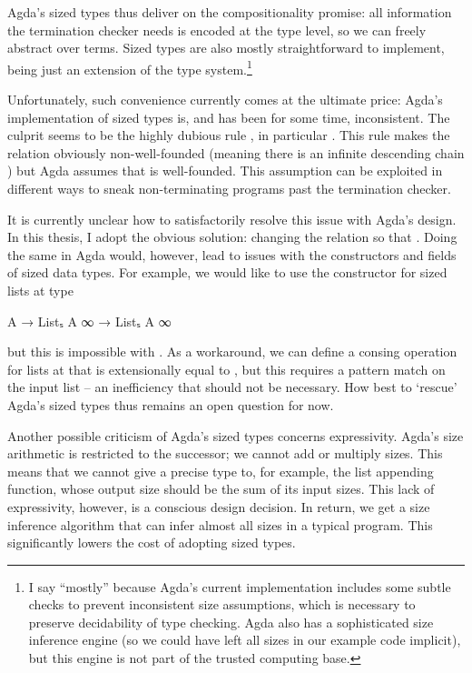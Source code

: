 Agda's sized types thus deliver on the compositionality promise: all information
the termination checker needs is encoded at the type level, so we can freely
abstract over terms. Sized types are also mostly straightforward to implement,
being just an extension of the type system.\footnote{I say \enquote{mostly}
  because Agda's current implementation includes some subtle checks to prevent
  inconsistent size assumptions, which is necessary to preserve decidability of
  type checking. Agda also has a sophisticated size inference engine (so we
  could have left all sizes in our example code implicit), but this engine is
  not part of the trusted computing base.}

Unfortunately, such convenience currently comes at the ultimate price: Agda's
implementation of sized types is, and has been for some time, inconsistent. The
culprit seems to be the highly dubious rule , in particular
. This rule makes the \icode{<} relation obviously non-well-founded
(meaning there is an infinite descending chain ) but Agda
assumes that \icode{<} is well-founded. This assumption can be exploited in
different ways \cite{agdabug2015,agdabug2016,agdabug2017,agdabug2018} to sneak
non-terminating programs past the termination checker.

It is currently unclear how to satisfactorily resolve this issue with Agda's
design. In this thesis, I adopt the obvious solution: changing the \icode{<}
relation so that . Doing the same in Agda would, however, lead to
issues with the constructors and fields of sized data types. For example, we
would like to use the  constructor for sized lists at type
\begin{code}
  A → Listₛ A ∞ → Listₛ A ∞
\end{code}
but this is impossible with . As a workaround, we can define a
consing operation for lists at  that is extensionally equal to
, but this requires a pattern match on the input list -- an
inefficiency that should not be necessary. How best to \enquote*{rescue} Agda's
sized types thus remains an open question for now.

Another possible criticism of Agda's sized types concerns expressivity. Agda's
size arithmetic is restricted to the successor; we cannot add or multiply sizes.
This means that we cannot give a precise type to, for example, the list
appending function, whose output size should be the sum of its input sizes. This
lack of expressivity, however, is a conscious design decision. In return, we get
a size inference algorithm that can infer almost all sizes in a typical program.
This significantly lowers the cost of adopting sized types.
